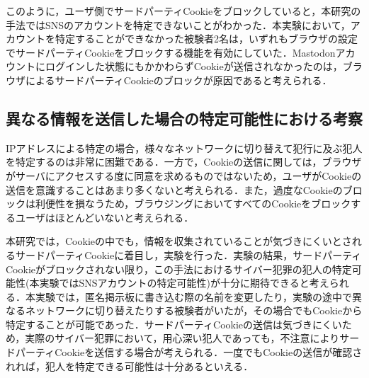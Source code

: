 \documentclass[10pt, a4paper]{jreport}
\begin{document}
このように，ユーザ側でサードパーティCookieをブロックしていると，本研究の手法ではSNSのアカウントを特定できないことがわかった．本実験において，アカウントを特定することができなかった被験者2名は，いずれもブラウザの設定でサードパーティCookieをブロックする機能を有効にしていた．Mastodonアカウントにログインした状態にもかかわらずCookieが送信されなかったのは，ブラウザによるサードパーティCookieのブロックが原因であると考えられる．

\subsection{異なる情報を送信した場合の特定可能性における考察}
IPアドレスによる特定の場合，様々なネットワークに切り替えて犯行に及ぶ犯人を特定するのは非常に困難である．一方で，Cookieの送信に関しては，ブラウザがサーバにアクセスする度に同意を求めるものではないため，ユーザがCookieの送信を意識することはあまり多くないと考えられる．また，過度なCookieのブロックは利便性を損なうため，ブラウジングにおいてすべてのCookieをブロックするユーザはほとんどいないと考えられる．

本研究では，Cookieの中でも，情報を収集されていることが気づきにくいとされるサードパーティCookieに着目し，実験を行った．実験の結果，サードパーティCookieがブロックされない限り，この手法におけるサイバー犯罪の犯人の特定可能性(本実験ではSNSアカウントの特定可能性)が十分に期待できると考えられる．本実験では，匿名掲示板に書き込む際の名前を変更したり，実験の途中で異なるネットワークに切り替えたりする被験者がいたが，その場合でもCookieから特定することが可能であった．サードパーティCookieの送信は気づきにくいため，実際のサイバー犯罪において，用心深い犯人であっても，不注意によりサードパーティCookieを送信する場合が考えられる．一度でもCookieの送信が確認されれば，犯人を特定できる可能性は十分あるといえる．

\end{document}
